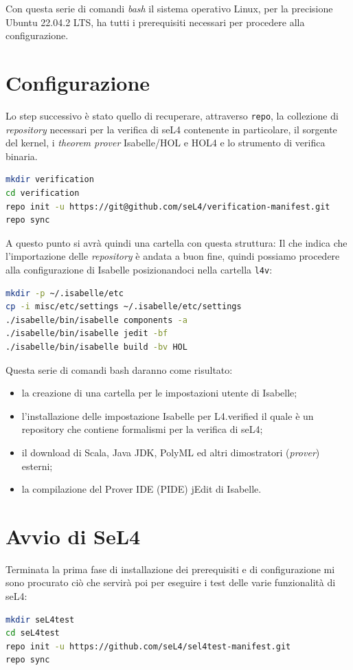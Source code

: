 Con questa serie di comandi \textit{bash} il sistema operativo Linux, per la precisione Ubuntu 22.04.2 LTS, ha tutti i prerequisiti necessari per procedere alla configurazione.

\section{Configurazione}
Lo step successivo è stato quello di recuperare, attraverso \texttt{repo}, la collezione di \textit{repository} necessari per la verifica di seL4 contenente in particolare, il sorgente del kernel, i \textit{theorem prover} Isabelle/HOL e HOL4 e lo strumento di verifica binaria.
\begin{lstlisting}[language=bash]
mkdir verification
cd verification
repo init -u https://git@github.com/seL4/verification-manifest.git
repo sync
\end{lstlisting}

A questo punto  si avrà quindi una cartella con questa struttura:
Il che indica che l'importazione delle \textit{repository} è andata a buon fine, quindi possiamo procedere alla configurazione di Isabelle posizionandoci nella cartella \texttt{l4v}:
\begin{lstlisting}[language=bash]
mkdir -p ~/.isabelle/etc
cp -i misc/etc/settings ~/.isabelle/etc/settings
./isabelle/bin/isabelle components -a
./isabelle/bin/isabelle jedit -bf
./isabelle/bin/isabelle build -bv HOL
\end{lstlisting}

Questa serie di comandi bash daranno come risultato:
\begin{itemize}
	\item la creazione di una cartella per le impostazioni utente di Isabelle;
	\item l'installazione delle impostazione Isabelle per L4.verified \cite{l4v} il quale è un repository che contiene formalismi per la verifica di seL4;
	\item il download di Scala, Java JDK, PolyML ed altri dimostratori (\textit{prover}) esterni;
	\item la compilazione del Prover IDE (PIDE) jEdit di Isabelle.
\end{itemize} 

\section{Avvio di SeL4}
Terminata la prima fase di installazione dei prerequisiti e di configurazione mi sono procurato ciò che servirà poi per eseguire i test delle varie funzionalità di seL4:
\begin{lstlisting}[language=bash]
mkdir seL4test
cd seL4test
repo init -u https://github.com/seL4/sel4test-manifest.git
repo sync
\end{lstlisting}


